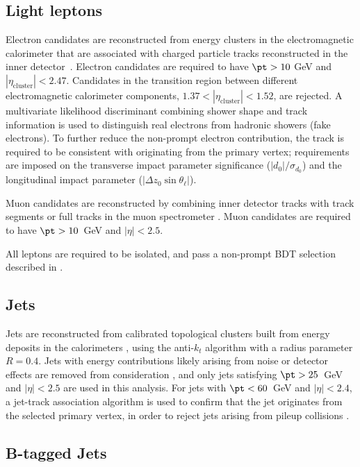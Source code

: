 \documentclass[NOTE, atlasdraft=true, texlive=2016, UKenglish]{\ATLASLATEXPATH atlasdoc}
\begin{document}
\subsection{Light leptons}
\label{subsec:leps}

Electron candidates are reconstructed from energy clusters in the electromagnetic calorimeter that are associated with charged particle tracks reconstructed in the inner detector~\cite{ATLAS-CONF-2016-024}.  Electron candidates are required to have $\pt > 10$ GeV and $|\eta_\textrm{cluster}| < 2.47$. Candidates in the transition region between different electromagnetic calorimeter components, $1.37 < |\eta_\textrm{cluster}| < 1.52$, are rejected. A multivariate likelihood discriminant combining shower shape and track information is used to distinguish real electrons from hadronic showers (fake electrons). To further reduce the non-prompt electron contribution, the track is required to be consistent with originating from the primary vertex; requirements are imposed on the transverse impact parameter significance ($|d_0|/\sigma_{d_0}$) and the longitudinal impact parameter ($|\Delta z_0 \sin \theta_\ell|$). 
                   
Muon candidates are reconstructed by combining inner detector tracks with track segments or full tracks in the muon spectrometer \cite{PERF-2014-05}. Muon candidates are required to have $\pt > 10$~GeV and $|\eta| < 2.5$. 

All leptons are required to be isolated, and pass a non-prompt BDT selection described in \cite{ttH_paper}. 

\subsection{Jets}
\label{subsec:jets}

Jets are reconstructed from calibrated topological clusters built from energy deposits in the calorimeters \cite{ATL-PHYS-PUB-2015-015}, using the anti-$k_t$ algorithm with a radius parameter $R=0.4$.  Jets with energy contributions likely arising from noise or detector effects are removed from consideration \cite{ATLAS-CONF-2015-029}, and only jets satisfying $\pt > 25$~GeV and $|\eta| < 2.5$ are used in this analysis.  For jets with $\pt < 60$~GeV and $|\eta| < 2.4$, a jet-track association algorithm is used to confirm that the jet originates from the selected primary vertex, in order to reject jets arising from pileup collisions \cite{PERF-2014-03}.

\subsection{B-tagged Jets}
\label{subsec:bjets}
\end{document}
